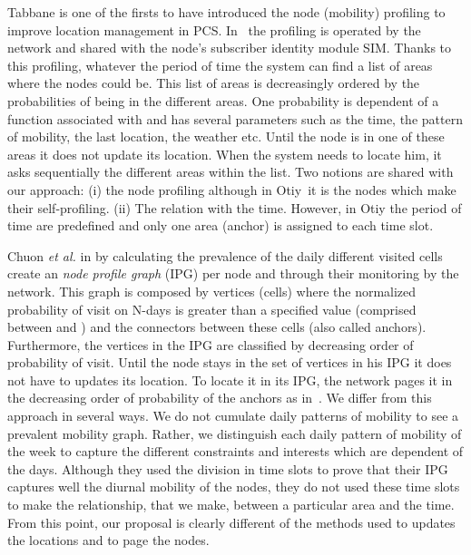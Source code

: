 \documentclass[a4paper]{sig-alternate-10pt}
\newcommand{\otiy}{{\sffamily Otiy}}
\begin{document}
Tabbane is one of the firsts to have introduced the node (mobility)
profiling to improve location management in \textsc{PCS}.
In~\cite{tabbane} the profiling is operated by the network and
shared with the node's subscriber identity module \textsc{SIM}.
Thanks to this profiling, whatever the period of time 
the system can find a list of areas where the nodes could be. This
list of areas is decreasingly ordered by the probabilities of being
in the different areas. One probability is dependent of a function
associated with and has several parameters such as the time, the
pattern of mobility, the last location, the weather etc. Until the
node is in one of these areas it does not update its location. When
the system needs to locate him, it asks sequentially the different
areas within the list. Two notions are shared with our approach: (i)
the node profiling although in \otiy\ it is the nodes which make
their self-profiling. (ii) The relation with the time. However, in
Otiy the period of time are predefined and only one area (anchor) is
assigned to each time slot.


Chuon \textit{et al.} in \cite{chuon} by calculating the prevalence
of the daily different visited cells create an \textit{node
profile graph} (\textsc{IPG}) per node and through their monitoring
by the network. This graph is composed by vertices (cells) where the
normalized probability of visit on N-days is greater than a
specified value (comprised between  and ) and the connectors
between these cells (also called anchors). Furthermore, the vertices
in the \textsc{IPG} are classified by decreasing order of
probability of visit. Until the node stays in the set of vertices in
his \textsc{IPG} it does not have to updates its location. To locate
it in its \textsc{IPG}, the network pages it in the decreasing
order of probability of the anchors as in~\cite{pollini}. We differ
from this approach in several ways. We do not cumulate daily
patterns of mobility to see a prevalent mobility graph. Rather, we
distinguish each daily pattern of mobility of the week to capture
the different constraints and interests which are dependent of the
days. Although they used the division in time slots to prove that
their \textsc{IPG} captures well the diurnal mobility of the nodes,
they do not used these time slots to make the relationship, that we
make, between a particular area and the time. From this point, our
proposal is clearly different of the methods used to updates the
locations and to page the nodes.
\end{document}
